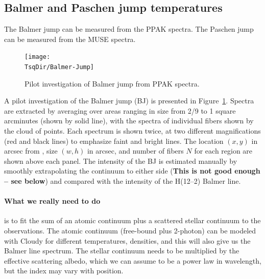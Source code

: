 \documentclass[preprint]{aastex}
\newcommand\TsqDir{/Users/will/Work/RubinWFC3/Tsquared}
\begin{document}
\subsection{Balmer and Paschen jump temperatures}
\label{sec:balmer-paschen-jump}

The Balmer jump can be measured from the PPAK spectra.  The Paschen
jump can be measured from the MUSE spectra. 

\begin{figure}
  \texttt{[image: \\TsqDir/Balmer-Jump]}
  \caption{Pilot investigation of Balmer jump from PPAK spectra.}
  \label{fig:balmer-jump-ppak}
\end{figure}

A pilot investigation of the Balmer jump (BJ) is presented in
Figure~\ref{fig:balmer-jump-ppak}.  Spectra are extracted by averaging
over areas ranging in size from 2/9 to 1 square arcminutes (shown by
solid line), with the spectra of individual fibers shown by the cloud
of points.  Each spectrum is shown twice, at two different
magnifications (red and black lines) to emphasize faint and bright
lines.  The location \((x, y)\) in arcsec from , size \((w,
h)\) in arcsec, and number of fibers \(N\) for each region are shown
above each panel.  The intensity of the BJ is estimated manually by
smoothly extrapolating the continuum to either side (\textbf{This is
  not good enough -- see below}) and compared with the intensity of
the H(12--2) Balmer line. 

\paragraph{What we really need to do} is to fit the sum of an atomic
continuum plus a scattered stellar continuum to the observations.  The
atomic continuum (free-bound plus 2-photon) can be modeled with Cloudy
for different temperatures, densities, and this will also give us the
Balmer line spectrum.  The stellar continuum needs to be multiplied by
the effective scattering albedo, which we can assume to be a power law
in wavelength, but the index may vary with position. 
\end{document}
